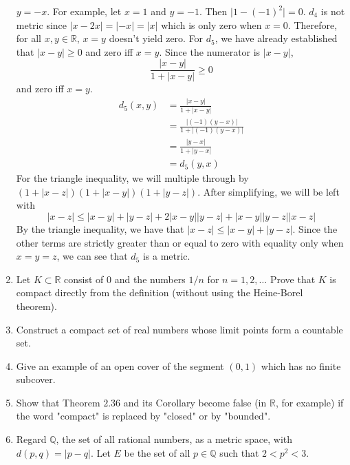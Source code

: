 \begin{enumerate}
  \(y = -x\).
  For example, let \(x = 1\) and \(y = -1\).
  Then \(\lvert 1 - (-1)^2\rvert = 0\).
  \(d_4\) is not metric since \(\lvert x - 2x\rvert = \lvert -x\rvert =
  \lvert x\rvert\) which is only zero when \(x = 0\).
  Therefore, for all \(x,y\in\mathbb{R}\), \(x = y\) doesn't yield zero.
  For \(d_5\), we have already established that \(\lvert x - y\rvert\geq 0\)
  and zero iff \(x = y\).
  Since the numerator is \(\lvert x - y\lvert\),
  \[
  \frac{\lvert x - y\rvert}{1 + \lvert x - y\rvert}\geq 0
  \]
  and zero iff \(x = y\).
  \begin{align*}
    d_5(x, y) & = \frac{\lvert x - y\rvert}{1 + \lvert x - y\rvert}\\
              & = \frac{\lvert (-1)(y - x)\rvert}
                {1 + \lvert (-1)(y - x)\rvert}\\
              & = \frac{\lvert y - x\rvert}{1 + \lvert y - x\rvert}\\
              & = d_5(y, x)
  \end{align*}
  For the triangle inequality, we will multiple through by
  \((1 + \lvert x - z\rvert)(1 + \lvert x - y\rvert)(1 + \lvert y - z\rvert)\).
  After simplifying, we will be left with
  \[
  \lvert x - z\rvert\leq\lvert x - y\rvert + \lvert y - z\rvert +
  2\lvert x - y\rvert\lvert y - z\rvert + \lvert x - y\rvert\lvert y - z\rvert
  \lvert x - z\rvert
  \]
  By the triangle inequality, we have that
  \(\lvert x - z\rvert\leq\lvert x - y\rvert + \lvert y - z\rvert\).
  Since the other terms are strictly greater than or equal to zero with
  equality only when \(x = y = z\), we can see that \(d_5\) is a metric.
\item
  Let \(K\subset\mathbb{R}\) consist of \(0\) and the numbers \(1/n\) for
  \(n = 1,2,\ldots\)
  Prove that \(K\) is compact directly from the definition (without using the
  Heine-Borel theorem).
\item
  Construct a compact set of real numbers whose limit points form a countable
  set.
\item
  Give an example of an open cover of the segment \((0, 1)\) which has no
  finite subcover.
\item
  Show that Theorem \(2.36\) and its Corollary become false (in \(\mathbb{R}\),
  for example) if the word "compact" is replaced by "closed" or by "bounded".
\item
  Regard \(\mathbb{Q}\), the set of all rational numbers, as a metric space,
  with \(d(p, q) = \lvert p - q\rvert\).
  Let \(E\) be the set of all \(p\in\mathbb{Q}\) such that \(2 < p^2 < 3\).

\end{enumerate}
